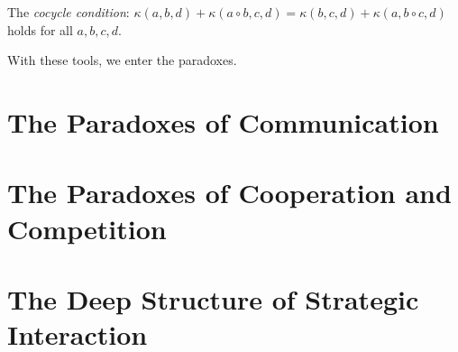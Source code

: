 \documentclass[11pt,openany]{book}
\theoremstyle{definition}
\theoremstyle{plain}
\theoremstyle{remark}
\newcommand{\compose}{\circ}
\newcommand{\emrg}{\kappa}
\begin{document}
The \emph{cocycle condition}: $\emrg(a,b,d) + \emrg(a \compose b, c, d) = \emrg(b,c,d) + \emrg(a, b \compose c, d)$ holds for all $a,b,c,d$.

With these tools, we enter the paradoxes.

\part{The Paradoxes of Communication}



\part{The Paradoxes of Cooperation and Competition}



\part{The Deep Structure of Strategic Interaction}


\end{document}
